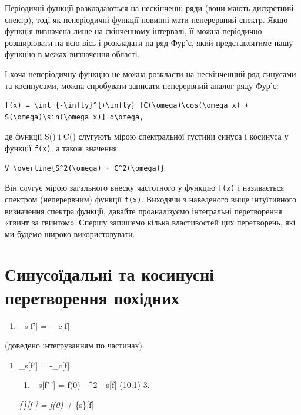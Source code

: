 \documentclass[
  ukrainian,
]{article}
\providecommand{\tightlist}{%
  \setlength{\itemsep}{0pt}\setlength{\parskip}{0pt}}
\begin{document}
Періодичні функції розкладаються на нескінченні ряди (вони мають
дискретний спектр), тоді як неперіодичні функції повинні мати
неперервний спектр. Якщо функція визначена лише на скінченному
інтервалі, її можна періодично розширювати на всю вісь і розкладати на
ряд Фур'є, який представлятиме нашу функцію в межах визначення області.

І хоча неперіодичну функцію не можна розкласти на нескінченний ряд
синусами та косинусами, можна спробувати записати неперервний аналог
ряду Фур'є:

\begin{verbatim}
f(x) = \int_{-\infty}^{+\infty} [C(\omega)\cos(\omega x) + S(\omega)\sin(\omega x)] d\omega,
\end{verbatim}

де функції S(\omega) і C(\omega) слугують мірою спектральної густини
синуса і косинуса у функції \texttt{f(x)}, а також значення

\begin{verbatim}
V \overline{S^2(\omega) + C^2(\omega)}
\end{verbatim}

Він слугує мірою загального внеску частотного \omega у функцію
\texttt{f(x)} і називається спектром (неперервним) функції
\texttt{f(x)}. Виходячи з наведеного вище інтуїтивного визначення
спектра функції, давайте проаналізуємо інтегральні перетворення «гвинт
за гвинтом». Спершу запишемо кілька властивостей цих перетворень, які ми
будемо широко використовувати.

\section{Синусоїдальні та косинусні перетворення
похідних}\label{ux441ux438ux43dux443ux441ux43eux457ux434ux430ux43bux44cux43dux456-ux442ux430-ux43aux43eux441ux438ux43dux443ux441ux43dux456-ux43fux435ux440ux435ux442ux432ux43eux440ux435ux43dux43dux44f-ux43fux43eux445ux456ux434ux43dux438ux445}

\begin{enumerate}
\def\labelenumi{\arabic{enumi}.}
\tightlist
\item
  \_s{[}f'{]} = -\omega {}\_c{[}f{]}
\end{enumerate}

(доведено інтегруванням по частинах).

\begin{enumerate}
\def\labelenumi{\arabic{enumi}.}
\item
  \_s{[}f'{]} = -\omega {}\_c{[}f{]}

  \begin{enumerate}
  \def\labelenumii{\arabic{enumii}.}
  \setcounter{enumii}{1}
  \tightlist
  \item
    \_s{[}f'\,'{]} =  \omega f(0) - \omega\^{}2
    \_s{[}f{]} (10.1) 3.
  \end{enumerate}

  \emph{\{\rho\}{[}f'{]} =  f(0) +
  \omega {}}\{s\}{[}f{]}
\end{enumerate}
\end{document}
